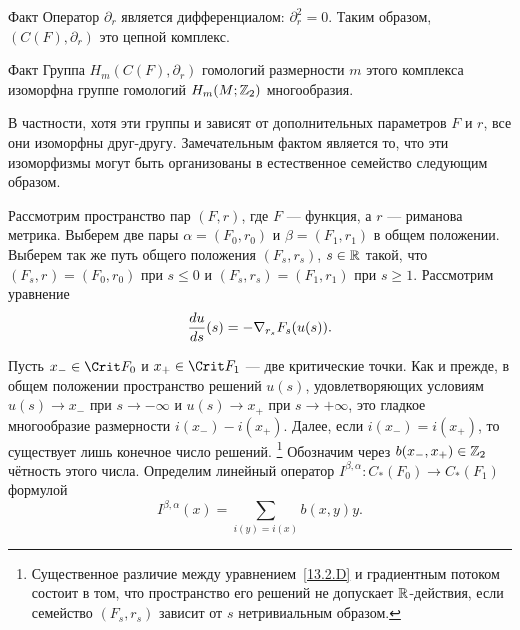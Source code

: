 \begin{thm}{Факт}\label{13.2.B}
  Оператор $\partial_{r}$ является дифференциалом: $\partial_{r}^{2}=0$.
  Таким образом, $(C(F),\partial_{r})$ это цепной комплекс. 
\end{thm}

\begin{thm}{Факт}\label{13.2.C}
  Группа $H_{m}(C(F),\partial_{r})$ гомологий размерности $m$ этого
  комплекса изоморфна группе гомологий $H_{m}(M; \mathbb{Z}_{2})$ многообразия.
\end{thm}

В частности, хотя эти группы и зависят от дополнительных параметров
$F$ и $r$, все они изоморфны друг-другу.
Замечательным фактом является то, что эти изоморфизмы могут быть
организованы в естественное семейство
следующим образом. 

Рассмотрим пространство пар $(F, r)$, где $F$ — функция, а $r$ —
риманова метрика. 
Выберем две пары $\alpha = (F_{0}, r_{0})$ и
$\beta = (F_{1},r_{1})$ в общем положении. Выберем так же путь общего положения
$(F_{s},r_{s})$, $s\in\mathbb{R}$ такой, что
$(F_{s}, r_{}) = (F_{0}, r_{0})$ при $s\le0$ и
$(F_{s}, r_{s}) = (F_{1},r_{1})$ при $s\ge1$.
Рассмотрим уравнение
\begin{equation}\label{13.2.D}
\frac{d u}{d s}(s)=-\nabla_{r_{s}}F_{s}(u(s)).
\end{equation}

Пусть $x_{-}\in\Crit F_{0}$ и $x_{+}\in\Crit F_{1}$ — две критические точки.
Как и прежде, в общем положении пространство решений $u(s)$,
удовлетворяющих условиям $u(s)\to x_{-}$ при $s\to-\infty$ и $u(s)\to
x_{+}$ при  $s\to+\infty$, это гладкое многообразие размерности
$i(x_{-})-i(x_{+})$.
Далее, если $i(x_{-}) = i(x_{+})$, то существует лишь конечное число
решений.%
\footnote{Существенное различие между уравнением~\ref{13.2.D} и
  градиентным потоком состоит в том, что пространство его решений
  не допускает $\mathbb{R}$-действия, если семейство $(F_{s},r_{s})$ зависит
  от $s$ нетривиальным образом.}
Обозначим через $b(x_{-},x_{+})\in\mathbb{Z}_{2}$ чётность этого числа.
Определим линейный оператор
$I^{\beta,\alpha} : C_{*}(F_{0})\to C_{*}(F_{1})$ формулой
\[
I^{\beta,\alpha}(x) = \sum_{i(y)=i(x)}b(x, y)y.
\]

